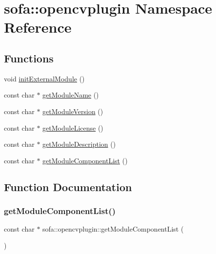 \hypertarget{namespacesofa_1_1opencvplugin}{}\section{sofa\+:\+:opencvplugin Namespace Reference}
\label{namespacesofa_1_1opencvplugin}
\subsection*{Functions}
\begin{DoxyCompactItemize}
\item 
void \hyperlink{namespacesofa_1_1opencvplugin_a68923956b35ccd564cd92eb6879f1435}{init\+External\+Module} ()
\item 
const char $\ast$ \hyperlink{namespacesofa_1_1opencvplugin_a9c2162e4fdffaa877be291ecad9a16ce}{get\+Module\+Name} ()
\item 
const char $\ast$ \hyperlink{namespacesofa_1_1opencvplugin_ab9ca27ce24fb20514581c71d9153d1b0}{get\+Module\+Version} ()
\item 
const char $\ast$ \hyperlink{namespacesofa_1_1opencvplugin_a5d6910b4bda53e6917dbd1c44d404a37}{get\+Module\+License} ()
\item 
const char $\ast$ \hyperlink{namespacesofa_1_1opencvplugin_a0ee281b8430d112a1e1ae9702fc8cb47}{get\+Module\+Description} ()
\item 
const char $\ast$ \hyperlink{namespacesofa_1_1opencvplugin_affac9080d88a8ed62de87cb40f972520}{get\+Module\+Component\+List} ()
\end{DoxyCompactItemize}


\subsection{Function Documentation}
\mbox{\label{namespacesofa_1_1opencvplugin_affac9080d88a8ed62de87cb40f972520}} 
\subsubsection{\texorpdfstring{get\+Module\+Component\+List()}{getModuleComponentList()}}
{\footnotesize\ttfamily const char $\ast$ sofa\+::opencvplugin\+::get\+Module\+Component\+List (\begin{DoxyParamCaption}{ }\end{DoxyParamCaption})}

